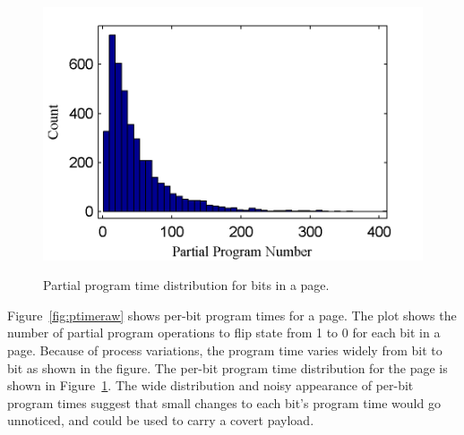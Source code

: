 \begin{figure} 
\begin{center} 
\includegraphics[width=\mywidth]{figs/hist_c1_block1_page1.png} 
\caption{Partial program time distribution for bits in a page.}
\vspace{-0.1in}
\label{fig:ptimehisto} 
\end{center} 
\end{figure} 

Figure~\ref{fig:ptimeraw} shows per-bit program times for a page. The plot
shows the number of partial program operations to flip state from 1 to 0 for each bit 
in a page. Because of process variations, the program time varies widely 
from bit to bit as shown in the figure. The per-bit program time distribution for the
page is shown in Figure~\ref{fig:ptimehisto}.
The wide distribution and noisy appearance of per-bit program times suggest that
small changes to each bit's program time would go unnoticed, and could be used to
carry a covert payload.

